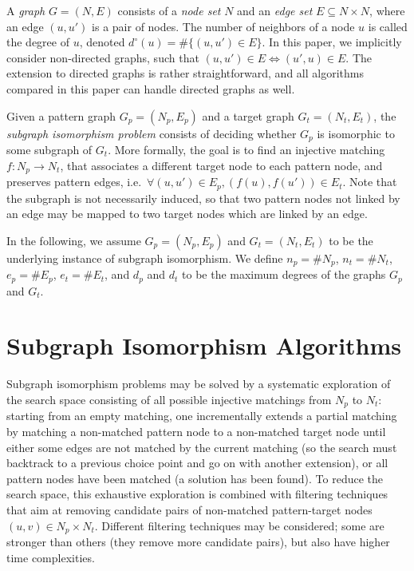 \documentclass{llncs}
\begin{document}
A \emph{graph} $G=(N,E)$ consists of a \emph{node set} $N$ and an \emph{edge set} $E \subseteq N
\times N$, where an edge $(u,u')$ is a pair of nodes. The number of neighbors of a node $u$ is
called the degree of $u$, denoted $d^\circ(u)=\#\{ (u,u')\in E\}$. In this paper, we implicitly consider
non-directed graphs, such that $(u,u')\in E\Leftrightarrow (u',u)\in E$. The extension to directed
graphs is rather straightforward, and all algorithms compared in this paper can handle directed
graphs as well.

Given a pattern graph $G_p=(N_p,E_p)$ and a target graph $G_t=(N_t,E_t)$, the \emph{subgraph
isomorphism problem} consists of deciding whether $G_p$ is isomorphic to some subgraph of $G_t$.
More formally, the goal is to find an injective matching $f: N_p\rightarrow N_t$, that associates a
different target node to each pattern node, and preserves pattern edges, i.e.\ $\forall (u,u')
\in E_p, (f(u),f(u')) \in E_t$.
Note that the subgraph is not necessarily induced, so that two pattern nodes not linked by
an edge may be mapped to two target nodes which are linked by an edge.

In the following, we assume $G_p=(N_p,E_p)$ and $G_t=(N_t,E_t)$ to be the underlying instance of 
subgraph isomorphism.  We  define $n_p = \# N_p$, $n_t = \# N_t$,  $e_p=\# E_p$, $e_t=\#
E_t$, and $d_p$ and $d_t$ to be the maximum degrees of the graphs $G_p$ and $G_t$.

\section{Subgraph Isomorphism Algorithms}\label{sec:algs}

Subgraph isomorphism problems may be solved by a systematic exploration of the search space consisting
of all possible injective matchings from $N_p$ to $N_t$: starting from an empty matching, one
incrementally extends a partial matching by matching a non-matched pattern node to a non-matched
target node until either some edges are not matched by the current matching (so the search must
backtrack to a previous choice point and go on with another extension), or all pattern nodes have
been matched (a solution has been found). To reduce the search space, this exhaustive exploration is
combined with filtering techniques that aim at removing candidate pairs of non-matched
pattern-target nodes $(u,v)\in N_p\times N_t$. Different filtering techniques may be considered;
some are stronger than others (they remove more candidate pairs), but also have higher time
complexities.
\end{document}
